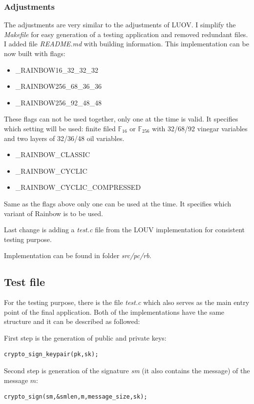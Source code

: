 \documentclass[thesis=M,english]{FITthesis}[2019/12/23]
\begin{document}
\subsubsection{Adjustments}
The adjustments are very similar to the adjustments of LUOV. I simplify the \textit{Makefile} for easy generation of a testing application and removed redundant files. I added file \textit{README.md} with building information. This implementation can be now built with flags:

\begin{itemize}
\item	\_RAINBOW16\_32\_32\_32
\item	\_RAINBOW256\_68\_36\_36
\item	\_RAINBOW256\_92\_48\_48
\end{itemize}
These flags can not be used together, only one at the time is valid. It specifies which setting will be used: finite filed $\mathbb{F}_{16}$ or $\mathbb{F}_{256}$ with 32/68/92 vinegar variables and two layers of 32/36/48 oil variables.

\begin{itemize}
\item	\_RAINBOW\_CLASSIC
\item	\_RAINBOW\_CYCLIC
\item	\_RAINBOW\_CYCLIC\_COMPRESSED
\end{itemize}
Same as the flags above only one can be used at the time. It specifies which variant of Rainbow is to be used.

\bigskip
\noindent
Last change is adding a \textit{test.c} file from the LOUV implementation for consistent testing purpose.

\bigskip
\noindent
Implementation can be found in folder \textit{src/pc/rb}.

\subsection{Test file}
For the testing purpose, there is the file \textit{test.c} which also serves as the main entry point of the final application. Both of the implementations have the same structure and it can be described as followed:

\bigskip
\noindent
First step is the generation of public and private keys:
\begin{lstlisting}[frame=single]
crypto_sign_keypair(pk,sk);
\end{lstlisting}

\bigskip
\noindent
Second step is generation of the signature \textit{sm} (it also contains the message) of the message $m$:
\begin{lstlisting}[frame=single]
crypto_sign(sm,&smlen,m,message_size,sk);
\end{lstlisting}
\end{document}
